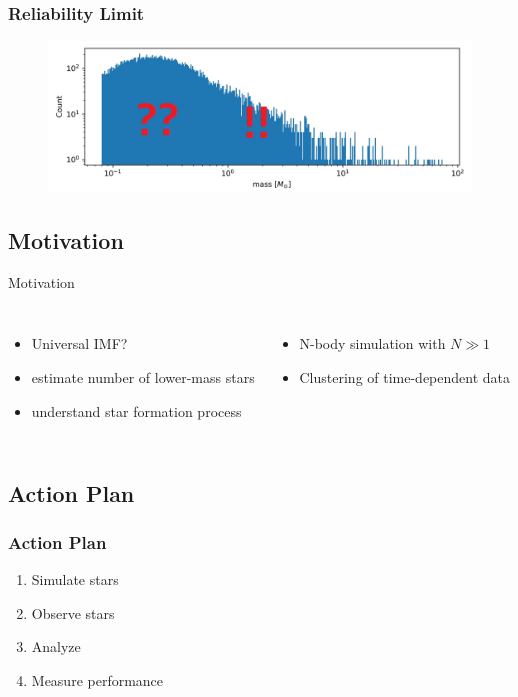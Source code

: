\documentclass{beamer}
\begin{document}
\begin{frame}
\frametitle{Reliability Limit}
  \begin{figure}
  \includegraphics[width=\linewidth]{Images/IMF2.jpg}
  \end{figure}
\end{frame}

\subsection{Motivation}

\begin{frame}
\begin{block}{Motivation}
	\begin{columns}[T]
	\vspace{0.5em}
	\begin{itemize}
	\item Universal IMF?
	\item estimate number of lower-mass stars
	\item understand star formation process
	\end{itemize}
	\vspace{0.5em}
	\begin{itemize}
	\item N-body simulation with \(N \gg 1\)
	\item Clustering of time-dependent data
	\end{itemize}
	\end{columns}
\end{block}
\end{frame}


\subsection{Action Plan}

\begin{frame}
\frametitle{Action Plan}
\begin{enumerate}[I]
\item Simulate stars
\item Observe stars
\item Analyze
\item Measure performance
\end{enumerate}
\end{frame}
\end{document}
